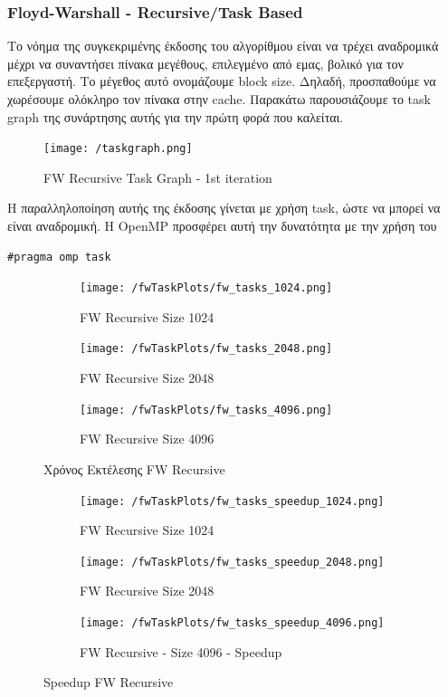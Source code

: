 \documentclass[letterpaper,12pt]{article}
\begin{document}
\subsubsection{Floyd-Warshall - Recursive/Task Based}

Το νόημα της συγκεκριμένης έκδοσης του αλγορίθμου είναι να τρέχει αναδρομικά μέχρι να συναντήσει πίνακα
μεγέθους, επιλεγμένο από εμας, βολικό για τον επεξεργαστή. Το μέγεθος αυτό ονομάζουμε block size. Δηλαδή, προσπαθούμε να χωρέσουμε ολόκληρο τον
πίνακα στην cache. Παρακάτω παρουσιάζουμε το task graph της συνάρτησης αυτής για την πρώτη φορά που καλείται.

\begin{figure}[H]
    \centering
    \texttt{[image: /taskgraph.png]}
    \caption{FW Recursive Task Graph - 1st iteration}
    \label{fig:FW Recursive Task Graph}
\end{figure}

Η παραλληλοποίηση αυτής της έκδοσης γίνεται με χρήση task, ώστε να μπορεί να είναι αναδρομική.
Η OpenMP προσφέρει αυτή την δυνατότητα με την χρήση του

\begin{lstlisting}
#pragma omp task
\end{lstlisting}

\begin{figure}[H]
    \centering
    \begin{subfigure}[b]{0.45\linewidth}
        \texttt{[image: /fwTaskPlots/fw\_tasks\_1024.png]}
        \caption{FW Recursive Size 1024}
    \end{subfigure}
    \begin{subfigure}[b]{0.45\linewidth}
        \texttt{[image: /fwTaskPlots/fw\_tasks\_2048.png]}
        \caption{FW Recursive Size 2048}
    \end{subfigure}
    \begin{subfigure}[b]{0.5\linewidth}
        \texttt{[image: /fwTaskPlots/fw\_tasks\_4096.png]}
        \caption{FW Recursive Size 4096}
    \end{subfigure}
    \caption{Χρόνος Εκτέλεσης FW Recursive}
    \label{fig:Χρόνος Εκτέλεσης FW Recursive}
\end{figure}

\begin{figure}[H]
    \centering
    \begin{subfigure}[b]{0.48\linewidth}
        \texttt{[image: /fwTaskPlots/fw\_tasks\_speedup\_1024.png]}
        \caption{FW Recursive Size 1024}
    \end{subfigure}
    \begin{subfigure}[b]{0.48\linewidth}
        \texttt{[image: /fwTaskPlots/fw\_tasks\_speedup\_2048.png]}
        \caption{FW Recursive Size 2048}
    \end{subfigure}
    \begin{subfigure}[b]{0.5\linewidth}
        \texttt{[image: /fwTaskPlots/fw\_tasks\_speedup\_4096.png]}
        \caption{FW Recursive - Size 4096 - Speedup}
    \end{subfigure}
    \caption{Speedup FW Recursive}
    \label{fig:Speedup FW Recursive}
\end{figure}
\end{document}
